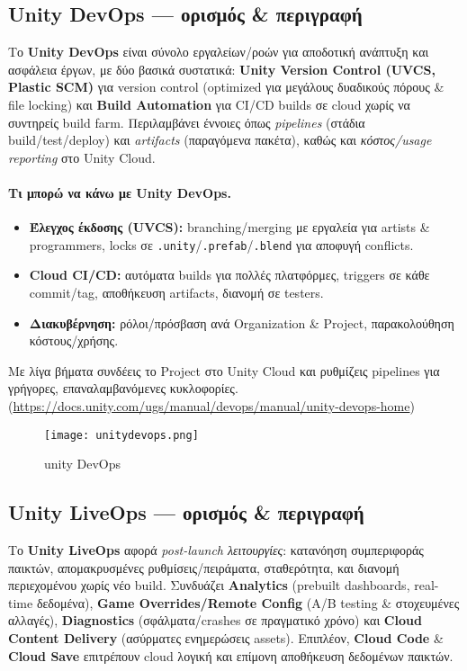 \subsection*{Unity DevOps — ορισμός \& περιγραφή}
Το \textbf{Unity DevOps} είναι σύνολο εργαλείων/ροών για αποδοτική ανάπτυξη και ασφάλεια έργων, με δύο βασικά συστατικά: \textbf{Unity Version Control (UVCS, Plastic SCM)} για version control (optimized για μεγάλους δυαδικούς πόρους \& file locking) και \textbf{Build Automation} για CI/CD builds σε cloud χωρίς να συντηρείς build farm. Περιλαμβάνει έννοιες όπως \emph{pipelines} (στάδια build/test/deploy) και \emph{artifacts} (παραγόμενα πακέτα), καθώς και \emph{κόστος/usage reporting} στο Unity Cloud.

\paragraph{Τι μπορώ να κάνω με Unity DevOps.}
\begin{itemize}
  \item \textbf{Έλεγχος έκδοσης (UVCS):} branching/merging με εργαλεία για artists \& programmers, locks σε \texttt{.unity}/\texttt{.prefab}/\texttt{.blend} για αποφυγή conflicts.
  \item \textbf{Cloud CI/CD:} αυτόματα builds για πολλές πλατφόρμες, triggers σε κάθε commit/tag, αποθήκευση artifacts, διανομή σε testers.
  \item \textbf{Διακυβέρνηση:} ρόλοι/πρόσβαση ανά Organization \& Project, παρακολούθηση κόστους/χρήσης.
\end{itemize}

 Με λίγα βήματα συνδέεις το Project στο Unity Cloud και ρυθμίζεις pipelines για γρήγορες, επαναλαμβανόμενες κυκλοφορίες. (\href{https://docs.unity.com/ugs/manual/devops/manual/unity-devops-home}{https://docs.unity.com/ugs/manual/devops/manual/unity-devops-home})

\begin{figure}[H]
    \centering
    \texttt{[image: unitydevops.png]}
    \caption{unity DevOps}
    \label{fig:placeholder}
\end{figure}

\subsection*{Unity LiveOps — ορισμός \& περιγραφή}
Το \textbf{Unity LiveOps} αφορά \emph{post-launch λειτουργίες}: κατανόηση συμπεριφοράς παικτών, απομακρυσμένες ρυθμίσεις/πειράματα, σταθερότητα, και διανομή περιεχομένου χωρίς νέο build. Συνδυάζει \textbf{Analytics} (prebuilt dashboards, real-time δεδομένα), \textbf{Game Overrides/Remote Config} (A/B testing \& στοχευμένες αλλαγές), \textbf{Diagnostics} (σφάλματα/crashes σε πραγματικό χρόνο) και \textbf{Cloud Content Delivery} (ασύρματες ενημερώσεις assets). Επιπλέον, \textbf{Cloud Code} \& \textbf{Cloud Save} επιτρέπουν cloud λογική και επίμονη αποθήκευση δεδομένων παικτών.

